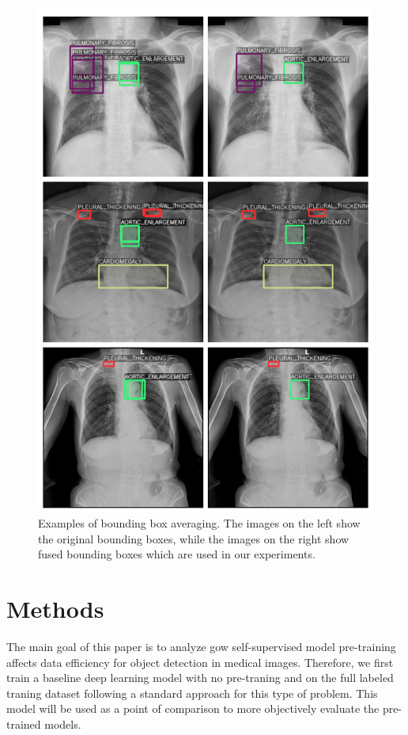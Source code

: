 \documentclass[conference]{IEEEtran}
\begin{document}
\begin{figure}[h]
\centering
\includegraphics[width=\columnwidth]{images/wbf}
\caption{Examples of bounding box averaging. The images on the left show the original bounding boxes, while the images on the right show fused bounding boxes which are used in our experiments.}
\label{fig:wbf}
\end{figure}


\section{Methods}

The main goal of this paper is to analyze gow self-supervised model pre-training affects data efficiency for object detection in medical images. Therefore, we first train a baseline deep learning model with no pre-traning and on the full labeled traning dataset following a standard approach for this type of problem. This model will be used as a point of comparison to more objectively evaluate the pre-trained models.
\end{document}
